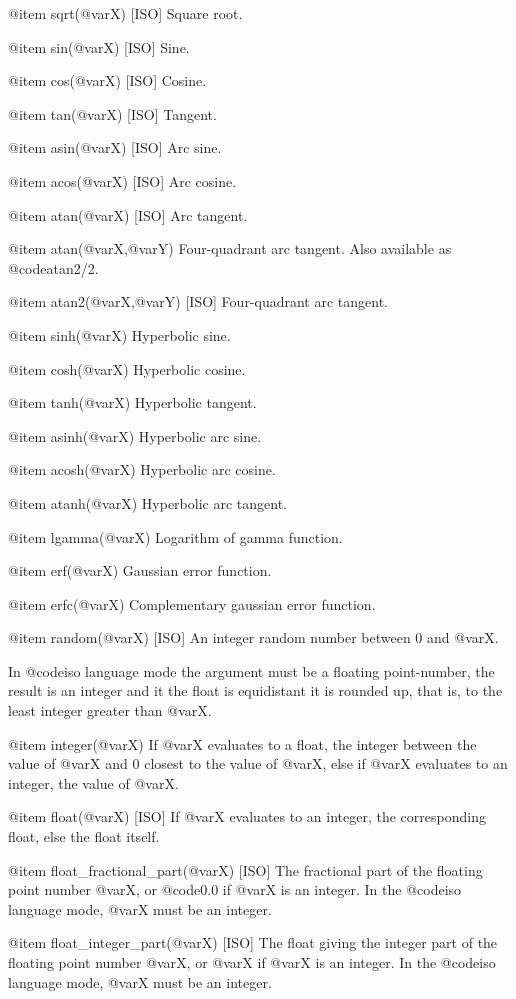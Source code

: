 {{{{@item sqrt(@var{X}) [ISO]
Square root.

@item sin(@var{X}) [ISO]
Sine.

@item cos(@var{X}) [ISO]
Cosine.

@item tan(@var{X}) [ISO]
Tangent.

@item asin(@var{X}) [ISO]
Arc sine.

@item acos(@var{X}) [ISO]
Arc cosine.

@item atan(@var{X}) [ISO]
Arc tangent.

@item atan(@var{X},@var{Y})
Four-quadrant arc tangent. Also available as @code{atan2/2}.

@item atan2(@var{X},@var{Y}) [ISO]
Four-quadrant arc tangent.

@item sinh(@var{X})
Hyperbolic sine.

@item cosh(@var{X})
Hyperbolic cosine.

@item tanh(@var{X})
Hyperbolic tangent.

@item asinh(@var{X})
Hyperbolic arc sine.

@item acosh(@var{X})
Hyperbolic arc cosine.

@item atanh(@var{X})
Hyperbolic arc tangent.

@item lgamma(@var{X})
Logarithm of gamma function.

@item erf(@var{X})
Gaussian error function.

@item erfc(@var{X})
Complementary gaussian error function.

@item random(@var{X}) [ISO]
An integer random number between 0 and @var{X}.

In @code{iso} language mode the argument must be a floating
point-number, the result is an integer and it the float is equidistant
it is rounded up, that is, to the least integer greater than @var{X}.

@item integer(@var{X})
If @var{X} evaluates to a float, the integer between the value of @var{X}
and 0 closest to the value of @var{X}, else if @var{X} evaluates to an
integer, the value of @var{X}.

@item float(@var{X}) [ISO]
If @var{X} evaluates to an integer, the corresponding float, else the float
itself.

@item float_fractional_part(@var{X}) [ISO]
The fractional part of the floating point number @var{X}, or @code{0.0}
if @var{X} is an integer. In the @code{iso} language mode,
@var{X} must be an integer.

@item float_integer_part(@var{X}) [ISO]
The float giving the integer part of the floating point number @var{X},
or @var{X} if @var{X} is an integer. In the @code{iso} language mode,
@var{X} must be an integer.

}}}}
